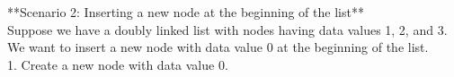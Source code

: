 \documentclass[preview]{standalone}
\begin{document}
**Scenario 2: Inserting a new node at the beginning of the list**\\Suppose we have a doubly linked list with nodes having data values 1, 2, and 3. We want to insert a new node with data value 0 at the beginning of the list.\\1. Create a new node with data value 0.\\
\end{document}
